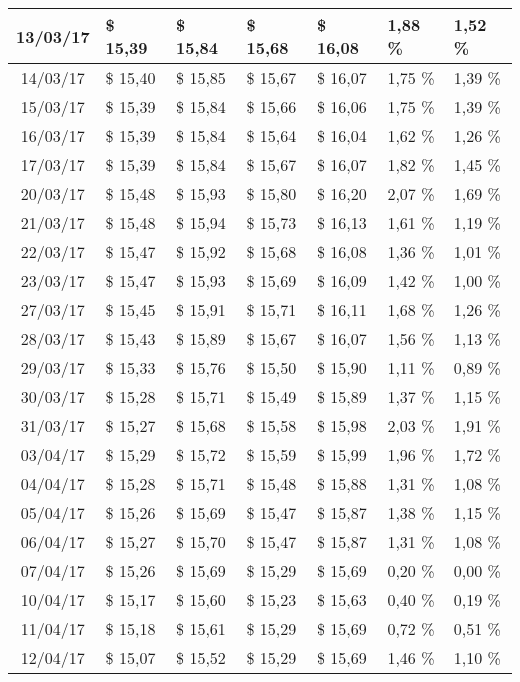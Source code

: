 \begin{center}
\begin{longtable}{|c|p{1.5cm}|p{1.5cm}|p{1.5cm}|p{1.5cm}|p{1.5cm}|p{1.5cm}|}
13/03/17 & \$ 15,39 & \$ 15,84 & \$ 15,68 & \$ 16,08 & 1,88 \% & 1,52 \% \\ \hline
14/03/17 & \$ 15,40 & \$ 15,85 & \$ 15,67 & \$ 16,07 & 1,75 \% & 1,39 \% \\ \hline
15/03/17 & \$ 15,39 & \$ 15,84 & \$ 15,66 & \$ 16,06 & 1,75 \% & 1,39 \% \\ \hline
16/03/17 & \$ 15,39 & \$ 15,84 & \$ 15,64 & \$ 16,04 & 1,62 \% & 1,26 \% \\ \hline
17/03/17 & \$ 15,39 & \$ 15,84 & \$ 15,67 & \$ 16,07 & 1,82 \% & 1,45 \% \\ \hline
20/03/17 & \$ 15,48 & \$ 15,93 & \$ 15,80 & \$ 16,20 & 2,07 \% & 1,69 \% \\ \hline
21/03/17 & \$ 15,48 & \$ 15,94 & \$ 15,73 & \$ 16,13 & 1,61 \% & 1,19 \% \\ \hline
22/03/17 & \$ 15,47 & \$ 15,92 & \$ 15,68 & \$ 16,08 & 1,36 \% & 1,01 \% \\ \hline
23/03/17 & \$ 15,47 & \$ 15,93 & \$ 15,69 & \$ 16,09 & 1,42 \% & 1,00 \% \\ \hline
27/03/17 & \$ 15,45 & \$ 15,91 & \$ 15,71 & \$ 16,11 & 1,68 \% & 1,26 \% \\ \hline
28/03/17 & \$ 15,43 & \$ 15,89 & \$ 15,67 & \$ 16,07 & 1,56 \% & 1,13 \% \\ \hline
29/03/17 & \$ 15,33 & \$ 15,76 & \$ 15,50 & \$ 15,90 & 1,11 \% & 0,89 \% \\ \hline
30/03/17 & \$ 15,28 & \$ 15,71 & \$ 15,49 & \$ 15,89 & 1,37 \% & 1,15 \% \\ \hline
31/03/17 & \$ 15,27 & \$ 15,68 & \$ 15,58 & \$ 15,98 & 2,03 \% & 1,91 \% \\ \hline
03/04/17 & \$ 15,29 & \$ 15,72 & \$ 15,59 & \$ 15,99 & 1,96 \% & 1,72 \% \\ \hline
04/04/17 & \$ 15,28 & \$ 15,71 & \$ 15,48 & \$ 15,88 & 1,31 \% & 1,08 \% \\ \hline
05/04/17 & \$ 15,26 & \$ 15,69 & \$ 15,47 & \$ 15,87 & 1,38 \% & 1,15 \% \\ \hline
06/04/17 & \$ 15,27 & \$ 15,70 & \$ 15,47 & \$ 15,87 & 1,31 \% & 1,08 \% \\ \hline
07/04/17 & \$ 15,26 & \$ 15,69 & \$ 15,29 & \$ 15,69 & 0,20 \% & 0,00 \% \\ \hline
10/04/17 & \$ 15,17 & \$ 15,60 & \$ 15,23 & \$ 15,63 & 0,40 \% & 0,19 \% \\ \hline
11/04/17 & \$ 15,18 & \$ 15,61 & \$ 15,29 & \$ 15,69 & 0,72 \% & 0,51 \% \\ \hline
12/04/17 & \$ 15,07 & \$ 15,52 & \$ 15,29 & \$ 15,69 & 1,46 \% & 1,10 \% \\ \hline

\end{longtable}
\end{center}
